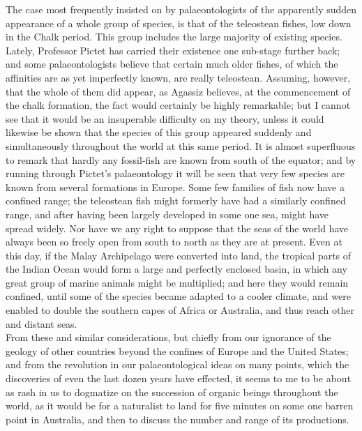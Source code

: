 \indent The case most frequently insisted on by palaeontologists of the apparently sudden appearance of a whole group of species, is that of the teleostean fishes, low down in the Chalk period. This group includes the large majority of existing species. Lately, Professor Pictet has carried their existence one sub-stage further back; and some palaeontologists believe that certain much older fishes, of which the affinities are as yet imperfectly known, are really teleostean. Assuming, however, that the whole of them did appear, as Agassiz believes, at the commencement of the chalk formation, the fact would certainly be highly remarkable; but I cannot see that it would be an insuperable difficulty on my theory, unless it could likewise be shown that the species of this group appeared suddenly and simultaneously throughout the world at this same period. It is almost superfluous to remark that hardly any fossil-fish are known from south of the equator; and by running through Pictet's palaeontology it will be seen that very few species are known from several formations in Europe. Some few families of fish now have a confined range; the teleostean fish might formerly have had a similarly confined range, and after having been largely developed in some one sea, might have spread widely. Nor have we any right to suppose that the seas of the world have always been so freely open from south to north as they are at present. Even at this day, if the Malay Archipelago were converted into land, the tropical parts of the Indian Ocean would form a large and perfectly enclosed basin, in which any great group of marine animals might be multiplied; and here they would remain confined, until some of the species became adapted to a cooler climate, and were enabled to double the southern capes of Africa or Australia, and thus reach other and distant seas.\\
\indent From these and similar considerations, but chiefly from our ignorance of the geology of other countries beyond the confines of Europe and the United States; and from the revolution in our palaeontological ideas on many points, which the discoveries of even the last dozen years have effected, it seems to me to be about as rash in us to dogmatize on the succession of organic beings throughout the world, as it would be for a naturalist to land for five minutes on some one barren point in Australia, and then to discuss the number and range of its productions.\\
